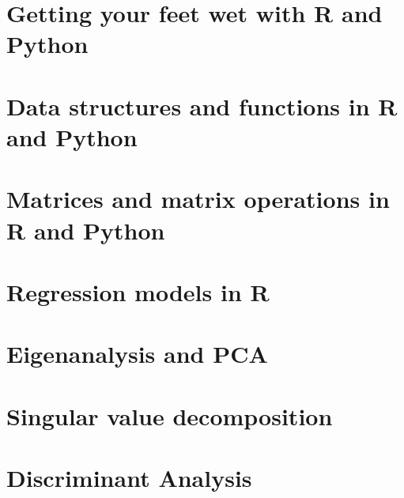 \documentclass[9pt,oneside,bigheadings,tablecaptionabove]{scrbook}
\begin{document}


\clearscrheadfoot
\pagestyle{scrheadings}

\titleLL
\clearpage
{}


\tableofcontents
\clearpage


\clearscrheadfoot
{}
\ihead{\tikzhead\headmark}
\ohead{\pagemark}
\pagestyle{scrheadings}
\renewcommand*{\chapterpagestyle}{scrheadings}
 

\chapter{Getting your feet wet with R and Python}



\chapter{Data structures and functions in R and Python}


\chapter{Matrices and matrix operations in R and Python}


\chapter{Regression models in R}


\chapter{Eigenanalysis and PCA}


\chapter{Singular value decomposition}


\chapter{Discriminant Analysis}

\end{document}
